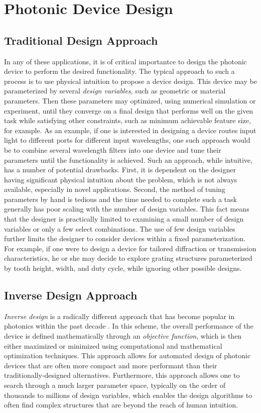 \section{Photonic Device Design}

\subsection{Traditional Design Approach}

In any of these applications, it is of critical importantce to design the photonic device to perform the desired functionality.
The typical approach to such a process is to use physical intuition to propose a device design.
This device may be parameterized by several \textit{design variables}, such as geometric or material parameters.
Then these parameters may optimized, using numerical simulation or experiment, until they converge on a final design that performs well on the given task while satisfying other constraints, such as minimum achievable feature size, for example.
As an example, if one is interested in designing a device routes input light to different ports for different input wavelengths, one such approach would be to combine several wavelength filters into one device and tune their parameters until the functionality is achieved.
Such an approach, while intuitive, has a number of potential drawbacks.
First, it is dependent on the designer having significant physical intuition about the problem, which is not always available, especially in novel applications.
Second, the method of tuning parameters by hand is tedious and the time needed to complete such a task generally has poor scaling with the number of design variables.
This fact means that the designer is practically limited to examining a small number of design variables or only a few select combinations.
The use of few design variables further limits the designer to consider devices within a fixed parameterization.
For example, if one were to design a device for tailored diffraction or transmission characteristics, he or she may decide to explore grating structures parameterized by tooth height, width, and duty cycle, while ignoring other possible designs.

\subsection{Inverse Design Approach}

\textit{Inverse design} is a radically different approach that has become popular in photonics within the past decade \cite{molesky_inverse_2018}.  
In this scheme, the overall performance of the device is defined mathematically through an \textit{objective function}, which is then either maximized or minimized using computational and mathematical optimization techniques.
This approach allows for automated design of photonic devices that are often more compact and more performant than their traditionally-designed alternatives.
Furthermore, this approach allows one to search through a much larger parameter space, typically on the order of thousands to millions of design variables, which enables the design algorithms to often find complex structures that are beyond the reach of human intuition.

